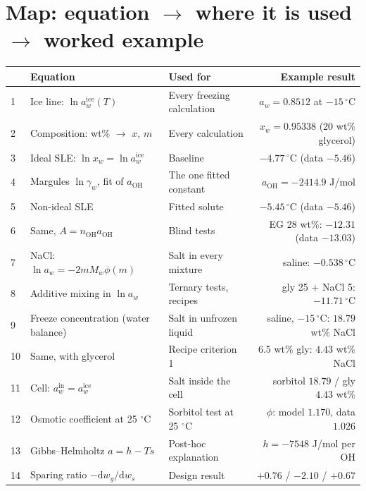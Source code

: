 \documentclass[11pt,a4paper]{article}
\newcommand{\aoh}{a_{\mathrm{OH}}}
\newcommand{\aice}{\ln a_w^{\mathrm{ice}}}
\begin{document}
\section*{Map: equation $\rightarrow$ where it is used $\rightarrow$ worked example}
\small
\begin{tabularx}{\textwidth}{@{}l L L r@{}}
\toprule
& Equation & Used for & Example result\\
 & Ice line: $\aice(T)$ & Every freezing calculation & $a_w=0.8512$ at $-15\,^\circ$C\\
2 & Composition: wt\% $\rightarrow$ $x$, $m$ & Every calculation & $x_w=0.95338$ (20 wt\% glycerol)\\
3 & Ideal SLE: $\ln x_w=\aice$ & Baseline & $-4.77\,^\circ$C (data $-5.46$)\\
4 & Margules $\ln\gamma_w$, fit of $\aoh$ & The one fitted constant & $\aoh=-2414.9$ J/mol\\
5 & Non-ideal SLE & Fitted solute & $-5.45\,^\circ$C (data $-5.46$)\\
6 & Same, $A=n_\mathrm{OH}\aoh$ & Blind tests & EG 28 wt\%: $-12.31$ (data $-13.03$)\\
7 & NaCl: $\ln a_w=-2m M_w\phi(m)$ & Salt in every mixture & saline: $-0.538\,^\circ$C\\
8 & Additive mixing in $\ln a_w$ & Ternary tests, recipes & gly 25 + NaCl 5: $-11.71\,^\circ$C\\
9 & Freeze concentration (water balance) & Salt in unfrozen liquid & saline, $-15\,^\circ$C: $18.79$ wt\% NaCl\\
10 & Same, with glycerol & Recipe criterion 1 & 6.5 wt\% gly: $4.43$ wt\% NaCl\\
11 & Cell: $a_w^{\mathrm{in}}=a_w^{\mathrm{ice}}$ & Salt inside the cell & sorbitol $18.79$ / gly $4.43$ wt\%\\
12 & Osmotic coefficient at 25 $^\circ$C & Sorbitol test at 25 $^\circ$C & $\phi$: model $1.170$, data $1.026$\\
13 & Gibbs--Helmholtz $a=h-Ts$ & Post-hoc explanation & $h=-7548$ J/mol per OH\\
14 & Sparing ratio $-\mathrm{d}w_g/\mathrm{d}w_s$ & Design result & $+0.76$ / $-2.10$ / $+0.67$\\
\bottomrule
\end{tabularx}
\normalsize
\end{document}
